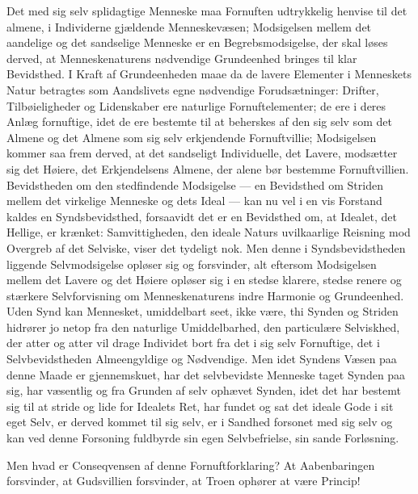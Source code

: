 \documentclass[12pt]{book}
\begin{document}
Det med sig selv splidagtige Menneske maa Fornuften udtrykkelig
henvise til det almene, i Individerne gjældende Menneskevæsen;
Modsigelsen mellem det aandelige og det sandselige Menneske er en
Begrebsmodsigelse, der skal løses derved, at Menneskenaturens
nødvendige Grundeenhed bringes til klar Bevidsthed. I Kraft af
Grundeenheden maae da de lavere Elementer i Menneskets Natur
betragtes som Aandslivets egne nødvendige Forudsætninger: Drifter,
Tilbøieligheder og Lidenskaber ere naturlige Fornuftelementer; de
ere i deres Anlæg fornuftige, idet de ere bestemte til at beherskes
af den sig selv som det Almene og det Almene som sig selv
erkjendende Fornuftvillie; Modsigelsen kommer saa frem derved, at
det sandseligt Individuelle, det Lavere, modsætter sig det Høiere,
det Erkjendelsens Almene, der alene bør bestemme Fornuftvillien.
Bevidstheden om den stedfindende Modsigelse --- en Bevidsthed om
Striden mellem det virkelige Menneske og dets Ideal --- kan nu vel i
en vis Forstand kaldes en Syndsbevidsthed, forsaavidt det er en
Bevidsthed om, at
Idealet, det Hellige, er krænket: Samvittigheden, den ideale Naturs
uvilkaarlige Reisning mod Overgreb af det Selviske, viser det
tydeligt nok. Men denne i Syndsbevidstheden liggende Selvmodsigelse
opløser sig og forsvinder, alt eftersom Modsigelsen mellem det
Lavere og det Høiere opløser sig i en stedse klarere, stedse renere
og stærkere Selvforvisning om Menneskenaturens indre Harmonie og
Grundeenhed. Uden Synd kan Mennesket, umiddelbart seet, ikke være,
thi Synden og Striden hidrører jo netop fra den naturlige
Umiddelbarhed, den particulære Selviskhed, der atter og atter vil
drage Individet bort fra det i sig selv Fornuftige, det i
Selvbevidstheden Almeengyldige og Nødvendige. Men idet Syndens Væsen
paa denne Maade er gjennemskuet, har det selvbevidste Menneske taget
Synden paa sig, har væsentlig og fra Grunden af selv ophævet
Synden, idet det har bestemt sig til at stride og lide for Idealets
Ret, har fundet og sat det ideale Gode i sit eget Selv, er derved
kommet til sig selv, er i Sandhed forsonet med sig selv og kan ved
denne Forsoning fuldbyrde sin egen Selvbefrielse, sin sande
Forløsning.

Men hvad er Conseqvensen af denne Fornuftforklaring? At
Aabenbaringen forsvinder, at Gudsvillien forsvinder, at Troen
ophører at være Princip!
\end{document}
